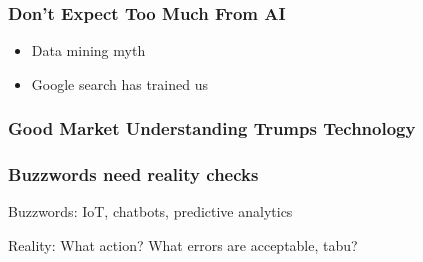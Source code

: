 \begin{frame}
\frametitle{Don't Expect Too Much From AI}
\begin{itemize}
\item Data mining myth
\item Google search has trained us
\end{itemize}
\end{frame}

\begin{frame}
\frametitle{Good Market Understanding Trumps Technology}
\end{frame}

\begin{frame}
\frametitle{Buzzwords need reality checks}
Buzzwords: IoT, chatbots, predictive analytics

Reality: What action? What errors are acceptable, tabu?
\end{frame}





